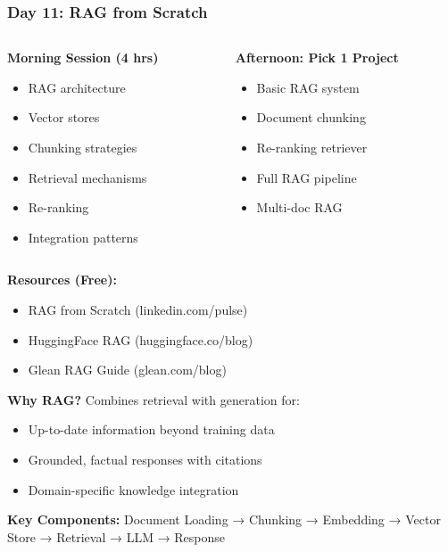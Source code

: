 \begin{frame}[fragile]\frametitle{Day 11: RAG from Scratch}
\begin{columns}
    \begin{column}[T]{0.5\linewidth}
      \textbf{Morning Session (4 hrs)}
      \begin{itemize}
        \item RAG architecture
        \item Vector stores
        \item Chunking strategies
        \item Retrieval mechanisms
        \item Re-ranking
        \item Integration patterns
      \end{itemize}
    \end{column}
    \begin{column}[T]{0.5\linewidth}
      \textbf{Afternoon: Pick 1 Project}
      \begin{itemize}
        \item Basic RAG system
        \item Document chunking
        \item Re-ranking retriever
        \item Full RAG pipeline
        \item Multi-doc RAG
      \end{itemize}
    \end{column}
  \end{columns}
  
  \vspace{0.3cm}
  \textbf{Resources (Free):}
  \begin{itemize}
    \item RAG from Scratch (linkedin.com/pulse)
    \item HuggingFace RAG (huggingface.co/blog)
    \item Glean RAG Guide (glean.com/blog)
  \end{itemize}
  
\textbf{Why RAG?} Combines retrieval with generation for:
\begin{itemize}
  \item Up-to-date information beyond training data
  \item Grounded, factual responses with citations
  \item Domain-specific knowledge integration
\end{itemize}
  
\textbf{Key Components:}
Document Loading → Chunking → Embedding → Vector Store → Retrieval → LLM → Response  
\end{frame}

